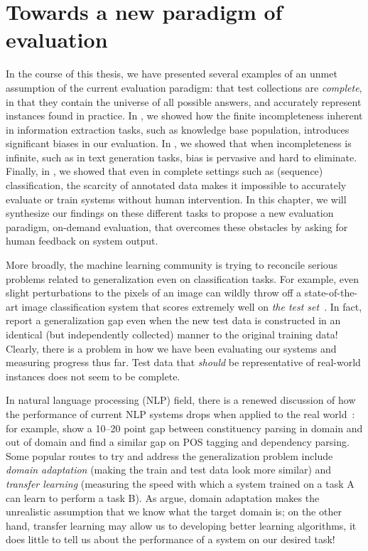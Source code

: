 \chapter[Towards a new paradigm of evaluation]{\label{chap:discussion} Towards a new paradigm of evaluation}

In the course of this thesis, we have presented several examples of an unmet assumption of the current evaluation paradigm: that test collections are \textit{complete}, in that they contain the universe of all possible answers, and accurately represent instances found in practice.
In , we showed how the finite incompleteness inherent in information extraction tasks, such as knowledge base population, introduces significant biases in our evaluation.
In , we showed that when incompleteness is infinite, such as in text generation tasks, bias is pervasive and hard to eliminate.
Finally, in , we showed that even in complete settings such as (sequence) classification, the scarcity of annotated data makes it impossible to accurately evaluate or train systems without human intervention.
In this chapter, we will synthesize our findings on these different tasks to propose a new evaluation paradigm, on-demand evaluation, that overcomes these obstacles by asking for human feedback on system output.

More broadly, the machine learning community is trying to reconcile serious problems related to generalization even on classification tasks.
For example, even slight perturbations to the pixels of an image can wildly throw off a state-of-the-art image classification system that scores extremely well on \textit{the test set}~\citep{}.
In fact, \citet{} report a generalization gap even when the new test data is constructed in an identical (but independently collected) manner to the original training data!
Clearly, there is a problem in how we have been evaluating our systems and measuring progress thus far.
Test data that \textit{should} be representative of real-world instances does not seem to be complete.

In natural language processing (NLP) field,
  there is a renewed discussion of how the performance of current NLP systems drops when applied to the real world~\citet{plank16nonstandard}: 
for example, \citet{mcclosky2010any} show a 10--20 point gap between constituency parsing in domain and out of domain and \citet{foster2011news} find a similar gap on POS tagging and dependency parsing.
Some popular routes to try and address the generalization problem include \textit{domain adaptation} (making the train and test data look more similar) and \textit{transfer learning} (measuring the speed with which a system trained on a task A can learn to perform a task B).
As \citet{plank16nonstandard} argue, domain adaptation makes the unrealistic assumption that we know what the target domain is;
  on the other hand, transfer learning may allow us to developing better learning algorithms, it does little to tell us about the performance of a system on our desired task!

